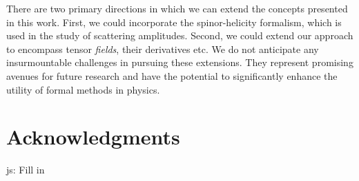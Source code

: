 \documentclass[a4paper, 11pt]{article}
\newcommand{\js}[1]{ {\color{magenta} js:  #1}}
\begin{document}
There are two primary directions in which we can extend the concepts presented in this work. 
First, we could incorporate the spinor-helicity formalism, which is used in the study of scattering 
amplitudes. Second, we could extend our approach to encompass tensor \emph{fields}, their derivatives
etc. We do not anticipate any insurmountable challenges in pursuing these extensions. 
They represent promising avenues for future research and have the potential to significantly enhance
the utility of formal methods in physics.
\section*{Acknowledgments}
\js{Fill in}


\begin{spacing}{0.5}

\end{spacing}
\end{document}
